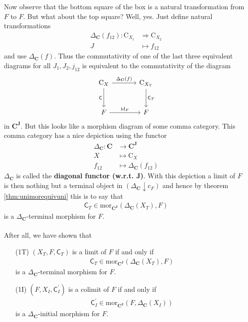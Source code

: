 Now observe that the bottom square of the box is a natural transformation from $F$ to $F$. But what about the top square? Well, yes. Just define natural transformations
\begin{align*}
  \Delta_{\mathbf{C}}(f_{12})
  \colon
  \mathrm{C}_{X_{1}}
  &\Rightarrow
  \mathrm{C}_{X_{2}}
  \\
  J
  &\mapsto
  f_{12}
\end{align*}
and use $\Delta_{\mathbf{C}}(f)$. Thus the commutativity of one of the last three equivalent diagrams for all $J_{1},J_{2},j_{12}$ is equivalent to the commutativity of the diagram
\[
\begin{tikzcd}[sep=large]
  \mathrm{C}_{X}
  \arrow{r}{\Delta_{\mathbf{C}}(f)}
  \arrow[swap]{d}{\mathsf{C}}
  &
  \mathrm{C}_{X_{T}}
  \arrow{d}{\mathsf{C}_{T}}
  \\
  F
  \arrow{r}{\mathrm{id}_{F}}
  &
  F
\end{tikzcd}
\]
in $\mathbf{C}^{\mathbf{J}}$. But this looks like a morphism diagram of some comma category. This comma category has a nice depiction using the functor
\begin{align*}
  \Delta_{\mathbf{C}}
  \colon
  \mathbf{C}
  &\rightarrow
  \mathbf{C}^{\mathbf{J}}
  \\
  X
  &\mapsto
  \mathrm{C}_{X}
  \\
  f_{12}
  &\mapsto
  \Delta_{\mathbf{C}}(f_{12})
\end{align*}
$\Delta_{\mathbf{C}}$ is called the \textbf{diagonal functor (w.r.t. $\mathbf{J}$)}. With this depiction a limit of $F$ is then nothing but a terminal object in $(\Delta_{\mathbf{C}} \downarrow \mathrm{c}_{F})$ and hence by theorem \ref{thm:unimorequivuni} this is to say that
\begin{align*}
  \mathsf{C}_{T}
  \in
  \mathrm{mor}_{\mathbf{C}^{\mathbf{J}}}(\Delta_{\mathbf{C}}(X_{T}),F)
\end{align*}
is a $\Delta_{\mathbf{C}}$-terminal morphism for $F$.
\\\\
After all, we have shown that
\\
\begin{thm}
\label{thm:limitequiv}
\begin{enumerate}
\item[(1T)]
$(X_{T},F,\mathsf{C}_{T})$ is a limit of $F$ if and only if
\begin{align*}
  \mathsf{C}_{T}
  \in
  \mathrm{mor}_{\mathbf{C}^{\mathbf{J}}}(\Delta_{\mathbf{C}}(X_{T}),F)
\end{align*}
is a $\Delta_{\mathbf{C}}$-terminal morphism for $F$.
\item[(1I)]
$(F,X_{I},\mathsf{C}_{I}^{\prime})$ is a colimit of $F$ if and only if
\begin{align*}
  \mathsf{C}_{I}^{\prime}
  \in
  \mathrm{mor}_{\mathbf{C}^{\mathbf{J}}}(F,\Delta_{\mathbf{C}}(X_{I}))
\end{align*}
is a $\Delta_{\mathbf{C}}$-initial morphism for $F$.
\end{enumerate}
\end{thm}
